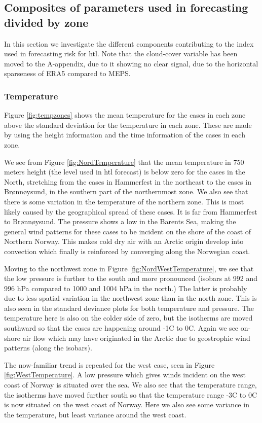 \subsection{Composites of parameters used in forecasting divided by zone}
In this section we investigate the different components contributing to the index used in forecasting risk for \acrlong{htl}. Note that the cloud-cover variable has been moved to the A-appendix, due to it showing no clear signal, due to the horizontal sparseness of ERA5 compared to MEPS.

\subsubsection{Temperature}
Figure \ref{fig:tempzones} shows the mean temperature for the cases in each zone above the standard deviation for the temperature in each zone. These are made by using the height information and the time information of the cases in each zone. 

We see from Figure \ref{fig:NordTemperature} that the mean temperature in 750 meters height (the level used in \acrshort{htl} forecast) is below zero for the cases in the North, stretching from the cases in Hammerfest in the northeast to the cases in Brønnøysund, in the southern part of the northernmost zone. We also see that there is some variation in the temperature of the northern zone. This is most likely caused by the geographical spread of these cases. It is far from Hammerfest to Brønnøysund. The pressure shows a low in the Barents Sea, making the general wind patterns for these cases to be incident on the shore of the coast of Northern Norway. This makes cold dry air with an Arctic origin develop into convection which finally is reinforced by converging along the Norwegian coast. 

Moving to the northwest zone in Figure \ref{fig:NordWestTemperature}, we see that the low pressure is further to the south and more pronounced (isobars at 992 and 996 hPa compared to 1000 and 1004 hPa in the north.) The latter is probably due to less spatial variation in the northwest zone than in the north zone. This is also seen in the standard deviance plots for both temperature and pressure. The temperature here is also on the colder side of zero, but the isotherms are moved southward so that the cases are happening around -1C to 0C. Again we see on-shore air flow which may have originated in the Arctic due to geostrophic wind patterns (along the isobars).

The now-familiar trend is repeated for the west case, seen in Figure \ref{fig:WestTemperature}. A low pressure which gives winds incident on the west coast of Norway is situated over the sea. We also see that the temperature range, the isotherms have moved further south so that the temperature range -3C to 0C is now situated on the west coast of Norway. Here we also see some variance in the temperature, but least variance around the west coast. 

